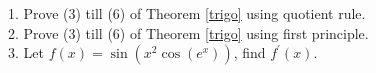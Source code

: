 1. Prove (3) till (6) of Theorem \ref{trigo} using quotient rule.\\
2. Prove (3) till (6) of Theorem \ref{trigo} using first principle.\\
3. Let $f(x)=\sin(x^2\cos(e^x))$, find $f^\prime(x)$.